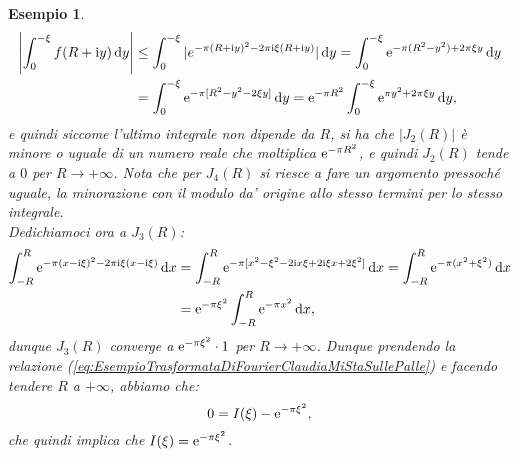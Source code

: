 \documentclass[11pt]{book}
\theoremstyle{Definizione}
\theoremstyle{TeoremaProposizioneLemmaCorollarioCongettura}
\theoremstyle{OsservazioneNotaEsempio}
\newtheorem{myes}{Esempio}[section]
\renewcommand{\i}{\textup{i}}
\newcommand{\e}{\textup{e}}
\renewcommand{\d}{\mathrm{d}}
\newcommand{\dx}{\,\d x}
\newcommand{\dy}{\,\d y}
\begin{document}
\begin{myes}
\begin{align*}
\left|\int_0^{-\xi} f(R+\i y)\dy\right| &\leq \int_{0}^{-\xi} |e^{-\pi (R+\i y)^2-2\pi \i\xi(R+\i y)} |\dy  = \int_0^{-\xi} \e^{-\pi(R^2-y^2)+2\pi \xi y} \dy \\
&= \int_0^{-\xi} \e^{-\pi[R^2-y^2-2\xi y]}\dy  = \e^{-\pi R^2} \int_{0}^{-\xi} \e^{\pi y^2+2\pi\xi y} \dy,
\end{align*}
e quindi siccome l'ultimo integrale non dipende da $R$, si ha che $|J_2(R)|$ è minore o uguale di un numero reale che moltiplica $\e^{-\pi R^2}$, e quindi $J_2(R)$ tende a $0$ per $R \to +\infty$.
Nota che per $J_4(R)$ si riesce a fare un argomento pressoché uguale, la minorazione con il modulo da' origine allo stesso termini per lo stesso integrale.\\
Dedichiamoci ora a $J_3(R)$:
\begin{align*}
\int_{-R}^{R} \e^{-\pi(x-\i\xi)^2-2\pi\i\xi(x-\i\xi)} \dx &= \int_{-R}^{R} \e^{-\pi[x^2-\xi^2-2\i x\xi+2\i\xi x +2\xi^2]}\dx = \int_{-R}^{R} \e^{-\pi(x^2+\xi^2)} \dx \\
&= \e^{-\pi \xi^2} \int_{-R}^{R} \e^{-\pi x^2} \dx,
\end{align*}
dunque $J_3(R)$ converge a $\e^{-\pi \xi^2} \cdot 1$ per $R \to +\infty$. Dunque prendendo la relazione (\ref{eq:EsempioTrasformataDiFourierClaudiaMiStaSullePalle}) e facendo tendere $R$ a $+\infty$, abbiamo che:
$$
0 = I(\xi) - \e^{-\pi \xi^2},
$$
che quindi implica che $I(\xi) = \e^{-\pi \xi^2}$.
\end{myes}
\end{document}
